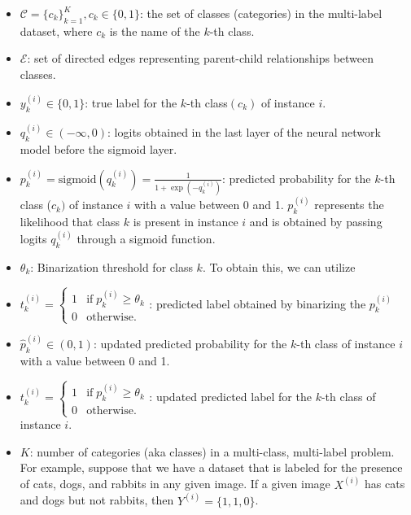 \begin{itemize}

    \item  $\mathcal{C} = {\{c_k\}}_{k=1}^{K} , c_k \in \{0,1\} $: the set of classes (categories) in the multi-label dataset, where $c_k $ is the name of the $k $-th class.

    \item  $\mathcal{E} $: set of directed edges representing parent-child relationships between classes.

    \item  $y_k^{(i)} \in \{0,1\} $: true label for the $k $-th class$(c_k) $ of instance $i $.

    \item  $q_k^{(i)} \in \left( -\infty,0 \right) $: logits obtained in the last layer of the neural network model before the sigmoid layer.

    \item  $p_k^{(i)} = \text{sigmoid}\left(q_k^{(i)}\right) = \frac{1}{1+\exp{\left(-q_k^{(i)}\right)}} $: predicted probability for the $k $-th class ($c_k) $ of instance $i $ with a value between 0 and 1. $p_k^{(i)} $ represents the likelihood that class $k $ is present in instance $i $ and is obtained by passing logits $q_k^{(i)} $ through a sigmoid function.

    \item  $\theta_k $: Binarization threshold for class $k $. To obtain this, we can utilize

    \item  $t_k^{(i)}=\left\{\begin{array}{lc}1&\text{if}\;p_k^{(i)} \geq \theta_k\\0&\text{otherwise.}\end{array}\right. $: predicted label obtained by binarizing the $p_k^{(i)} $

    \item  ${\widehat p}_k^{(i)} \in (0,1) $: updated predicted probability for the $k $-th class of instance $i $ with a value between 0 and 1.

    \item  $t_k^{(i)}=\left\{\begin{array}{lc}1&\text{if}\;p_k^{(i)}\geq\theta_k\\0&\text{otherwise.}\end{array}\right. $: updated predicted label for the $k $-th class of instance $i $.

    \item  $\ensuremath{K} $: number of categories (aka classes) in a multi-class, multi-label problem. For example, suppose that we have a dataset that is labeled for the presence of cats, dogs, and rabbits in any given image. If a given image $X^{(i)} $ has cats and dogs but not rabbits, then $Y^{(i)} = \{1,1,0\} $.


\end{itemize}
